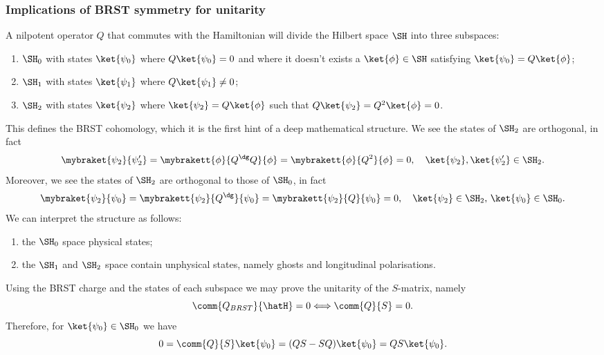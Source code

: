 \subsubsection{Implications of BRST symmetry for unitarity}
A nilpotent operator $Q$ that commutes with the Hamiltonian will divide the Hilbert space $\SH$ into three subspaces:
\begin{enumerate}
    \item $\SH_0$ with states $\ket{\psi_0}$ where $Q\ket{\psi_0} = 0$ and where it doesn't exists a $\ket{\phi} \in \SH$ satisfying $\ket{\psi_0} = Q\ket{\phi}$;
    \item $\SH_1$ with states $\ket{\psi_1}$ where $Q\ket{\psi_1} \neq 0$;
    \item $\SH_2$ with states $\ket{\psi_2}$ where $\ket{\psi_2} = Q\ket{\phi}$ such that $Q\ket{\psi_2} = Q^2\ket{\phi} = 0$.
\end{enumerate}
This defines the BRST cohomology, which it is the first hint of a deep mathematical structure. We see the states of $\SH_2$ are orthogonal, in fact
\begin{equation}
    \mybraket{\psi_2}{\psi_2'} = \mybrakett{\phi}{Q^\dg Q}{\phi} = \mybrakett{\phi}{Q^2}{\phi} = 0,\quad \ket{\psi_2},\ket{\psi_2'} \in \SH_2.
\end{equation}
Moreover, we see the states of $\SH_2$ are orthogonal to those of $\SH_0$, in fact
\begin{equation}
    \mybraket{\psi_2}{\psi_0} = \mybrakett{\psi_2}{Q^\dg}{\psi_0} = \mybrakett{\psi_2}{Q}{\psi_0} = 0,\quad \ket{\psi_2} \in \SH_2,\,\ket{\psi_0} \in \SH_0.
\end{equation}
We can interpret the structure as follows:
\begin{enumerate}
    \item the $\SH_0$ space physical states;
    \item the $\SH_1$ and $\SH_2$ space contain unphysical states, namely ghosts and longitudinal polarisations.
\end{enumerate}
Using the BRST charge and the states of each subspace we may prove the unitarity of the $S$-matrix, namely
\begin{equation}
    \comm{Q_{BRST}}{\hatH} = 0 \Longleftrightarrow \comm{Q}{S} = 0.
\end{equation}
Therefore, for $\ket{\psi_0} \in \SH_0$ we have
\begin{equation}
    0 = \comm{Q}{S}\ket{\psi_0} = (QS - SQ)\ket{\psi_0} = QS\ket{\psi_0}.
\end{equation}
